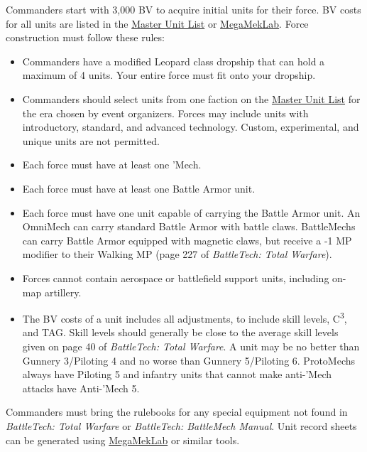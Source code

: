 Commanders start with 3,000 BV to acquire initial units for their force.
BV costs for all units are listed in the \href{http://www.masterunitlist.info}{Master Unit List} or \href{https://megamek.org}{MegaMekLab}.
Force construction must follow these rules:

\begin{itemize}

\item Commanders have a modified Leopard class dropship that can hold a maximum of 4 units.
Your entire force must fit onto your dropship.

\item Commanders should select units from one faction on the \href{http://www.masterunitlist.info/}{Master Unit List} for the era chosen by event organizers.
Forces may include units with introductory, standard, and advanced technology.
Custom, experimental, and unique units are not permitted.

\item Each force must have at least one 'Mech.

\item Each force must have at least one Battle Armor unit.

\item Each force must have one unit capable of carrying the Battle Armor unit.
An OmniMech can carry standard Battle Armor with battle claws.
BattleMechs can carry Battle Armor equipped with magnetic claws, but receive a -1 MP modifier to their Walking MP (page 227 of \emph{BattleTech: Total Warfare}).

\item Forces cannot contain aerospace or battlefield support units, including on-map artillery.

\item The BV costs of a unit includes all adjustments, to include skill levels, C\textsuperscript{3}, and TAG.
Skill levels should generally be close to the average skill levels given on page 40 of \emph{BattleTech: Total Warfare}.
A unit may be no better than Gunnery 3/Piloting 4 and no worse than Gunnery 5/Piloting 6.
ProtoMechs always have Piloting 5 and infantry units that cannot make anti-'Mech attacks have Anti-'Mech 5.

\end{itemize}

Commanders must bring the rulebooks for any special equipment not found in \emph{BattleTech: Total Warfare} or \emph{BattleTech: BattleMech Manual}.
Unit record sheets can be generated using \href{https://megamek.org}{MegaMekLab} or similar tools.

